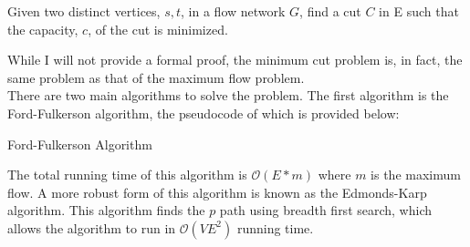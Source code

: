 \documentclass[11pt]{article}
\begin{document}
\begin{tcolorbox}
	Given two distinct vertices, $s, t$, in a flow network $G$, find  a cut $C$ in E such that the capacity, $c$, of the cut is minimized.  
\end{tcolorbox}
While I will not provide a formal proof, the minimum cut problem is, in fact, the same problem as that of the maximum flow problem. \\
There are two main algorithms to solve the problem. The first algorithm is the Ford-Fulkerson algorithm, the pseudocode of which is provided below: \\
\begin{algorithm}[H]
\caption{Ford-Fulkerson Algorithm}
\begin{algorithmic}
\EndFor
{}
\Else 
{}
\EndIf
\EndFor
\EndWhile
\end{algorithmic}
\end{algorithm}
The total running time of this algorithm is $\mathcal{O}(E*m)$ where $m$ is the maximum flow. A more robust form of this algorithm is known as the Edmonds-Karp algorithm. This algorithm finds the $p$ path using breadth first search, which allows the algorithm to run in $\mathcal{O}(VE^2)$ running time.
\end{document}
